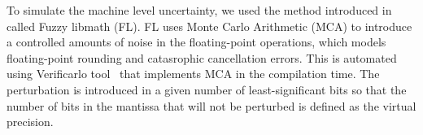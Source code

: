 \documentclass[conference]{IEEEtran}
\begin{document}
To simulate the machine level uncertainty, we used the method introduced in~\cite{salari2021accurate} called Fuzzy libmath (FL).
FL uses Monte Carlo Arithmetic (MCA) to introduce a controlled amounts of noise in the floating-point operations,
which models floating-point rounding and catasrophic cancellation errors.
This is automated using Verificarlo tool~\cite{denis2015verificarlo} that implements MCA in the compilation time.
The perturbation is introduced in a given number of least-significant bits so that
the number of bits in the mantissa that will not be perturbed is defined as the virtual precision.​



\end{document}
